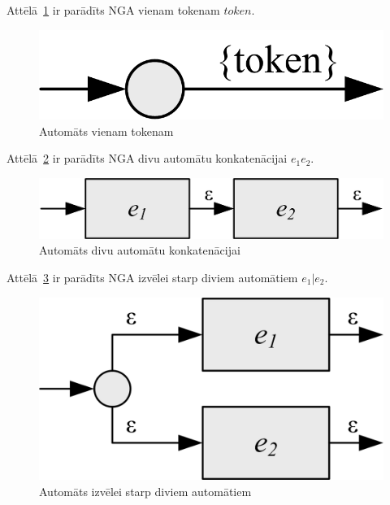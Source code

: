 Attēlā~\ref{fig:auto_token} ir parādīts NGA vienam tokenam ${token}$.
\begin{figure}[H]
  \centering
    \includegraphics[scale=1.5]{pictures/auto_token}
  \caption{\label{fig:auto_token}Automāts vienam tokenam}
\end{figure}

Attēlā~\ref{fig:auto_sequence} ir parādīts NGA divu automātu konkatenācijai $e_1 e_2$.
\begin{figure}[H]
  \centering
    \includegraphics[scale=1.5]{pictures/auto_sequence}
  \caption{\label{fig:auto_sequence}Automāts divu automātu konkatenācijai}
\end{figure}

Attēlā~\ref{fig:auto_or} ir parādīts NGA izvēlei starp diviem automātiem $e_1 | e_2$.
\begin{figure}[H]
  \centering
    \includegraphics[scale=1.5]{pictures/auto_or}
  \caption{\label{fig:auto_or}Automāts izvēlei starp diviem automātiem}
\end{figure}

